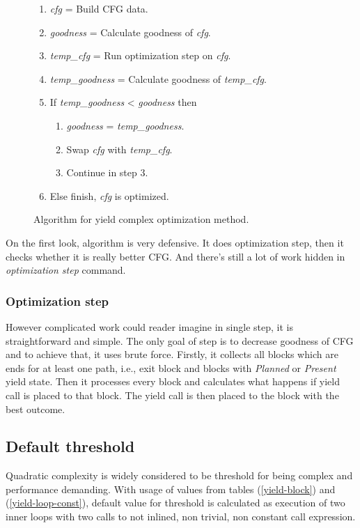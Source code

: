 \begin{figure}[h!]
\caption{Algorithm for yield complex optimization method.}
\begin{enumerate}
\item{\emph{cfg} = Build CFG data.}
\item{\emph{goodness} = Calculate goodness of \emph{cfg}.}
\item{\emph{temp\_cfg} = Run optimization step on \emph{cfg}.}
\item{\emph{temp\_goodness} = Calculate goodness of \emph{temp\_cfg}.}
\item{If \emph{temp\_goodness} < \emph{goodness} then}
	\begin{enumerate}[label=5.\arabic*.]
	\item{\emph{goodness} = \emph{temp\_goodness}.}
	\item{Swap \emph{cfg} with \emph{temp\_cfg}.}
	\item{Continue in step 3.}
	\end{enumerate}
\item{Else finish, \emph{cfg} is optimized.}
\end{enumerate}
\end{figure}

On the first look, algorithm is very defensive. It does optimization step, then it checks whether it is really better CFG. And there's still a lot of work hidden in \emph{optimization step} command.

\subsubsection{Optimization step}
However complicated work could reader imagine in single step, it is straightforward and simple. The only goal of step is to decrease goodness of CFG and to achieve that, it uses brute force. Firstly, it collects all blocks which are ends for at least one path, i.e., exit block and blocks with \emph{Planned} or \emph{Present} yield state. Then it processes every block and calculates what happens if yield call is placed to that block. The yield call is then placed to the block with the best outcome.

\subsection{Default threshold}
Quadratic complexity is widely considered to be threshold for being complex and performance demanding. With usage of values from tables (\ref{yield-block}) and (\ref{yield-loop-const}), default value for threshold is calculated as execution of two inner  loops with two calls to not inlined, non trivial, non constant call expression.

